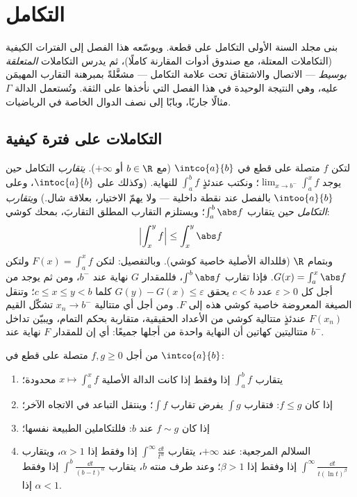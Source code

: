 \chapter{التكامل}\label{ch:b2:integration}

بنى مجلد السنة الأولى التكامل على قطعة. ويوسّعه هذا الفصل
إلى الفترات الكيفية (التكاملات المعتلة، مع صندوق أدوات
المقارنة كاملًا)، ثم يدرس التكاملات \emph{المتعلقة
بوسيط} --- الاتصال والاشتقاق تحت علامة
التكامل --- مشغَّلةً بمبرهنة التقارب المهيمَن عليه، وهي النتيجة
الوحيدة في هذا الفصل التي نأخذها على الثقة. وتُستعمل الدالة $\Gamma$
مثالًا جاريًا، وبابًا إلى نصف الدوال الخاصة
في الرياضيات.

\section{التكاملات على فترة كيفية}

\begin{definition}\label{def:b2:integration:improper}
لتكن $f$ متصلة على قطع في $\intco{a}{b}$ (مع $b \in \R$ أو
$+\infty$). \emph{يتقارب} التكامل
حين يوجد $\lim_{x \to b^-} \int_a^x f$؛ ونكتب عندئذٍ
$\int_a^b f$ للنهاية. (وكذلك على $\intoc{a}{b}$، وعلى
$\intoo{a}{b}$ بالفصل عند نقطة داخلية --- ولا يهمّ الاختيار،
بعلاقة شال.) و\emph{يتقارب التكامل }
حين يتقارب $\int_a^b \abs f$؛ ويستلزم التقارب المطلق
التقاربَ، بمحك كوشي:
\[
\Bigl| \int_x^{y} f \Bigr| \leq \int_x^{y} \abs f
\]
وبتمام $\R$ (فللدالة الأصلية خاصية كوشي).
وبالتفصيل: لتكن $F(x) = \int_a^x f$ ولتكن $G(x) = \int_a^x \abs
f$. فإذا تقارب $\int^b\abs f$، فللمقدار $G$ نهاية عند $b^-$، ومن ثم
يوجد من أجل كل $\varepsilon > 0$ عدد $c < b$ يحقق $G(y) - G(x)
\leq \varepsilon$ كلما $c \leq x \leq y < b$؛ وتنقل الصيغة
المعروضة خاصية كوشي هذه إلى $F$. ومن أجل أي متتالية $x_n
\to b^-$ تشكّل القيم $F(x_n)$ عندئذٍ متتالية كوشي من الأعداد
الحقيقية، متقاربة بحكم التمام، ويبيّن تداخل متتاليتين
كهاتين أن النهاية واحدة من أجلها جميعًا: أي إن للمقدار $F$
نهاية عند $b^-$.
\end{definition}

\begin{theorem}\label{thm:b2:integration:comparison}
من أجل $f, g \geq 0$ متصلة على قطع في $\intco{a}{b}$:
\begin{enumerate}
  \item يتقارب $\int_a^b f$ إذا وفقط إذا كانت الدالة الأصلية $x \mapsto \int_a^x
        f$ محدودة؛
  \item إذا كان $f \leq g$: فتقارب $\int g$ يفرض تقارب $\int f$؛
        وينتقل التباعد في الاتجاه الآخر؛
  \item إذا كان $f \sim g$ عند $b$: فللتكاملين الطبيعة نفسها؛
  \item السلالم المرجعية: عند $+\infty$، يتقارب $\int^{\infty}
        \frac{\dd t}{t^\alpha}$ إذا وفقط إذا $\alpha > 1$، ويتقارب
        $\int^\infty \frac{\dd t}{t(\ln t)^\beta}$ إذا وفقط إذا $\beta > 1$؛
        وعند طرف منته $b$، يتقارب $\int^b \frac{\dd t}{(b -
        t)^\alpha}$ إذا وفقط إذا $\alpha < 1$.
\end{enumerate}
\end{theorem}

